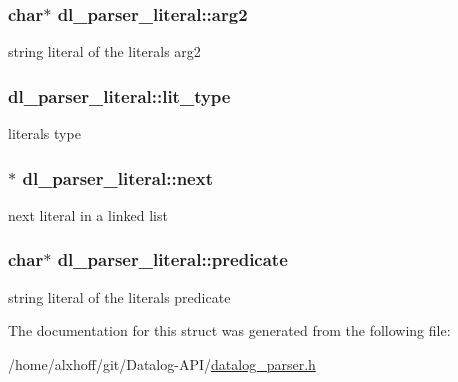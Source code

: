 \subsubsection[{\texorpdfstring{arg2}{arg2}}]{\setlength{\rightskip}{0pt plus 5cm}char$\ast$ dl\+\_\+parser\+\_\+literal\+::arg2}\hypertarget{structdl__parser__literal_a069378d1cdd069e6e3131c25c6f6fe40}{}\label{structdl__parser__literal_a069378d1cdd069e6e3131c25c6f6fe40}
string literal of the literal\textquotesingle{}s arg2 
\subsubsection[{\texorpdfstring{lit\+\_\+type}{lit_type}}]{ dl\+\_\+parser\+\_\+literal\+::lit\+\_\+type}\hypertarget{structdl__parser__literal_a8e4ab2c8fdcdf404c30069f9abd12544}{}\label{structdl__parser__literal_a8e4ab2c8fdcdf404c30069f9abd12544}
literal\textquotesingle{}s type 
\subsubsection[{\texorpdfstring{next}{next}}]{$\ast$ dl\+\_\+parser\+\_\+literal\+::next}\hypertarget{structdl__parser__literal_af1e52e4932e62608901b911045b566b7}{}\label{structdl__parser__literal_af1e52e4932e62608901b911045b566b7}
next literal in a linked list 
\subsubsection[{\texorpdfstring{predicate}{predicate}}]{\setlength{\rightskip}{0pt plus 5cm}char$\ast$ dl\+\_\+parser\+\_\+literal\+::predicate}\hypertarget{structdl__parser__literal_a29b6704d93332f103bd46525b651c62e}{}\label{structdl__parser__literal_a29b6704d93332f103bd46525b651c62e}
string literal of the literal\textquotesingle{}s predicate 

The documentation for this struct was generated from the following file\+:\begin{DoxyCompactItemize}
\item 
/home/alxhoff/git/\+Datalog-\/\+A\+P\+I/\hyperlink{datalog__parser_8h}{datalog\+\_\+parser.\+h}\end{DoxyCompactItemize}
